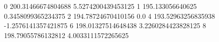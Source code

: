 0 200.31466674804688 5.5274200439453125
1 195.133056640625 0.3458099365234375
2 194.78724670410156 0.0
4 193.52963256835938 -1.2576141357421875
6 198.01327514648438 3.2260284423828125
8 198.79055786132812 4.0033111572265625
